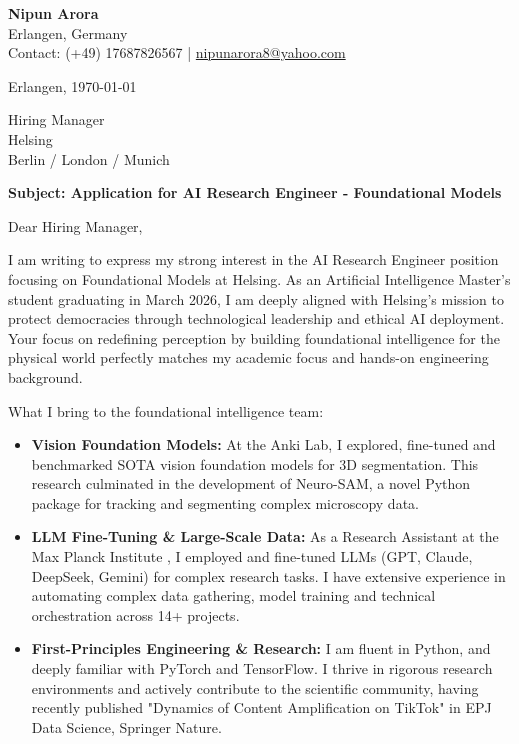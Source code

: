 \documentclass[11pt, a4paper]{letter}
\begin{document}
\begin{flushleft}
    \textbf{Nipun Arora}  \\
    Erlangen, Germany  \\
    Contact: (+49) 17687826567 | \href{mailto:nipunarora8@yahoo.com}{nipunarora8@yahoo.com} 
\end{flushleft}

\vspace{0.1cm}

\noindent Erlangen, \today

\vspace{0.2 cm}

\begin{flushleft}
    Hiring Manager \\
    Helsing \\
    Berlin / London / Munich
\end{flushleft}

\vspace{0.2 cm}

\noindent \textbf{Subject: Application for AI Research Engineer - Foundational Models}

\vspace{0.2cm}

\noindent Dear Hiring Manager,

\vspace{0.2cm}
I am writing to express my strong interest in the AI Research Engineer position focusing on Foundational Models at Helsing. As an Artificial Intelligence Master's student  graduating in March 2026, I am deeply aligned with Helsing’s mission to protect democracies through technological leadership and ethical AI deployment. Your focus on redefining perception by building foundational intelligence for the physical world perfectly matches my academic focus and hands-on engineering background.
\justifying

\vspace{0.2cm}
What I bring to the foundational intelligence team:
\begin{itemize}
\item \textbf{Vision Foundation Models:} At the Anki Lab, I explored, fine-tuned and benchmarked SOTA vision foundation models for 3D segmentation. This research culminated in the development of Neuro-SAM, a novel Python package for tracking and segmenting complex microscopy data.
\item \textbf{LLM Fine-Tuning \& Large-Scale Data:} As a Research Assistant at the Max Planck Institute , I employed and fine-tuned LLMs (GPT, Claude, DeepSeek, Gemini) for complex research tasks. I have extensive experience in automating complex data gathering, model training and technical orchestration  across 14+ projects.
\item \textbf{First-Principles Engineering \& Research:} I am fluent in Python, and deeply familiar with PyTorch and TensorFlow. I thrive in rigorous research environments and actively contribute to the scientific community, having recently published "Dynamics of Content Amplification on TikTok" in EPJ Data Science, Springer Nature.
\end{itemize}
\justifying
\end{document}
